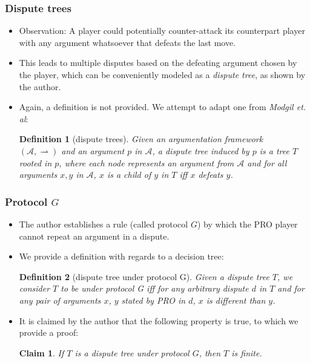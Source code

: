 \documentclass{beamer}
\newtheorem{Def}{Definition}[subsection]
\newtheorem{Claim}{Claim}
\newcommand{\df}{\ensuremath{\rightharpoonup}}
\begin{document}
\begin{frame}
	\frametitle{Dispute trees}
	\begin{itemize}
		\item Observation: A player could potentially counter-attack its counterpart player with any argument whatsoever that defeats the last move. \pause
		\item This leads to multiple disputes based on the defeating argument chosen by the player, which can be conveniently modeled as a \emph{dispute tree}, as shown by the author.\pause
		\item Again, a definition is not provided. We attempt to adapt one from \emph{Modgil et. al}:\pause
		\begin{Def}[dispute trees]
			Given an argumentation framework\\ $(\mathcal{A}, \df)$ and an argument $p$ in $\mathcal{A}$, a dispute tree induced by $p$ is a tree $T$ rooted in $p$, where each node represents an argument from $\mathcal{A}$ and for all arguments $x, y$ in $\mathcal{A}$, $x$ is a child of $y$ in $T$ iff $x$ defeats $y$.
		\end{Def}
	\end{itemize}
\end{frame}


\begin{frame}
	\frametitle{Protocol $G$}
	\begin{itemize}
		\item The author establishes a rule (called protocol $G$) by which the PRO player cannot repeat an argument in a dispute.\pause
		\item We provide a definition with regards to a decision tree:\pause
		\begin{Def}[dispute tree under protocol G]\label{protG}
			Given a dispute tree $T$, we consider $T$ to be under protocol G iff for any arbitrary dispute $d$ in $T$ and for any pair of arguments $x$, $y$ stated by PRO in $d$, $x$ is different than $y$.
		\end{Def}\pause
		\item It is claimed by the author that the following property is true, to which we provide a proof:\pause

		\begin{Claim}
			If $T$ is a dispute tree under protocol $G$, then $T$ is finite.
		\end{Claim}
	\end{itemize}
\end{frame}
\end{document}
